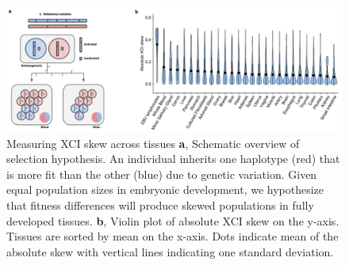 \begin{figure}[ht]
    \centering
    \includegraphics[width=\textwidth]{chapter4/Figures/Figure_1.pdf}
    \caption{
        Measuring XCI skew across tissues 
        \textbf{a}, Schematic overview of selection hypothesis. An individual inherits one haplotype (red) that is more fit than the other (blue) due to genetic variation. Given equal population sizes in embryonic development, we hypothesize that fitness differences will produce skewed populations in fully developed tissues.
        \textbf{b}, Violin plot of absolute XCI skew on the y-axis. Tissues are sorted by mean on the x-axis. Dots indicate mean of the absolute skew with vertical lines indicating one standard deviation.}
    \label{fig:fig4.1}
\end{figure}
